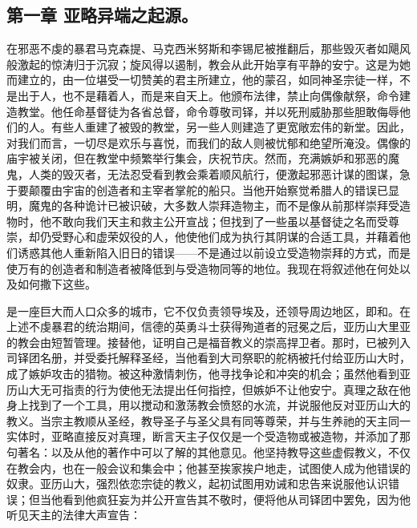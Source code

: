 
\subsection{第一章 亚略异端之起源。}

在邪恶不虔的暴君马克森提、马克西米努斯和李锡尼被推翻后，那些毁灭者如飓风般激起的惊涛归于沉寂；旋风得以遏制，教会从此开始享有平静的安宁。这是为她而建立的，由一位堪受一切赞美的君主所建立，他的蒙召，如同神圣宗徒一样，不是出于人，也不是藉着人，而是来自天上。他颁布法律，禁止向偶像献祭，命令建造教堂。他任命基督徒为各省总督，命令尊敬司铎，并以死刑威胁那些胆敢侮辱他们的人。有些人重建了被毁的教堂，另一些人则建造了更宽敞宏伟的新堂。因此，对我们而言，一切尽是欢乐与喜悦，而我们的敌人则被忧郁和绝望所淹没。偶像的庙宇被关闭，但在教堂中频繁举行集会，庆祝节庆。然而，充满嫉妒和邪恶的魔鬼，人类的毁灭者，无法忍受看到教会乘着顺风航行，便激起邪恶计谋的图谋，急于要颠覆由宇宙的创造者和主宰者掌舵的船只。当他开始察觉希腊人的错误已显明，魔鬼的各种诡计已被识破，大多数人崇拜造物主，而不是像从前那样崇拜受造物时，他不敢向我们天主和救主公开宣战；但找到了一些虽以基督徒之名而受尊崇，却仍受野心和虚荣奴役的人，他使他们成为执行其阴谋的合适工具，并藉着他们诱惑其他人重新陷入旧日的错误——不是通过以前设立受造物崇拜的方式，而是使万有的创造者和制造者被降低到与受造物同等的地位。我现在将叙述他在何处以及如何撒下这些。\par

是一座巨大而人口众多的城市，它不仅负责领导埃及，还领导周边地区，即和。在上述不虔暴君的统治期间，信德的英勇斗士获得殉道者的冠冕之后，亚历山大里亚的教会由短暂管理。接替他，证明自己是福音教义的崇高捍卫者。那时，已被列入司铎团名册，并受委托解释圣经，当他看到大司祭职的舵柄被托付给亚历山大时，成了嫉妒攻击的猎物。被这种激情刺伤，他寻找争论和冲突的机会；虽然他看到亚历山大无可指责的行为使他无法提出任何指控，但嫉妒不让他安宁。真理之敌在他身上找到了一个工具，用以搅动和激荡教会愤怒的水流，并说服他反对亚历山大的教义。当宗主教顺从圣经，教导圣子与圣父具有同等尊荣，并与生养祂的天主同一实体时，亚略直接反对真理，断言天主子仅仅是一个受造物或被造物，并添加了那句著名：以及从他的著作中可以了解的其他意见。他坚持教导这些虚假教义，不仅在教会内，也在一般会议和集会中；他甚至挨家挨户地走，试图使人成为他错误的奴隶。亚历山大，强烈依恋宗徒的教义，起初试图用劝诫和忠告来说服他认识错误；但当他看到他疯狂妄为并公开宣告其不敬时，便将他从司铎团中罢免，因为他听见天主的法律大声宣告：\par

